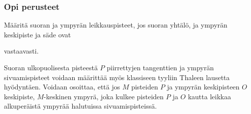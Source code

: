 \begin{tehtavasivu}

\subsubsection*{Opi perusteet}
\begin{tehtava}
Määritä suoran ja ympyrän leikkauspisteet, jos suoran yhtälö, ja ympyrän keskipiste ja säde ovat
\begin{alakohdat}
\end{alakohdat}
vastaavasti.
\begin{vastaus}
\begin{alakohdat}
\end{alakohdat}
\end{vastaus}
\end{tehtava}

\begin{tehtava}
Suoran ulkopuolisesta pisteestä $P$ piirrettyjen tangenttien ja ympyrän sivuamispisteet voidaan määrittää myös klassiseen tyyliin Thaleen lausetta hyödyntäen. Voidaan osoittaa, että jos $M$ pisteiden $P$ ja ympyrän keskipisteen $O$ keskipiste, $M$-keskinen ympyrä, joka kulkee pisteiden $P$ ja $O$ kautta leikkaa alkuperäistä ympyrää halutuissa sivuamispisteissä.

\begin{alakohdat}
\end{alakohdat}
\begin{vastaus}
\begin{alakohdat}
\end{alakohdat}
\end{vastaus}
\end{tehtava}


\end{tehtavasivu}
